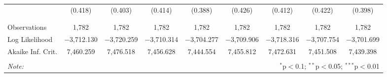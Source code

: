\begin{table}[!htbp]
\begin{tabular}{@{\extracolsep{5pt}}lcccccccc}
  & (0.418) & (0.403) & (0.414) & (0.388) & (0.426) & (0.412) & (0.422) & (0.398) \\ 
  & & & & & & & & \\ 
\hline \\[-1.8ex] 
Observations & 1,782 & 1,782 & 1,782 & 1,782 & 1,782 & 1,782 & 1,782 & 1,782 \\ 
Log Likelihood & $-$3,712.130 & $-$3,720.259 & $-$3,710.314 & $-$3,704.277 & $-$3,709.906 & $-$3,718.316 & $-$3,707.754 & $-$3,701.699 \\ 
Akaike Inf. Crit. & 7,460.259 & 7,476.518 & 7,456.628 & 7,444.554 & 7,455.812 & 7,472.631 & 7,451.508 & 7,439.398 \\ 
\hline 
\hline \\[-1.8ex] 
\textit{Note:}  & \multicolumn{8}{r}{$^{*}$p$<$0.1; $^{**}$p$<$0.05; $^{***}$p$<$0.01} \\ 
\end{tabular} 
\end{table} 
